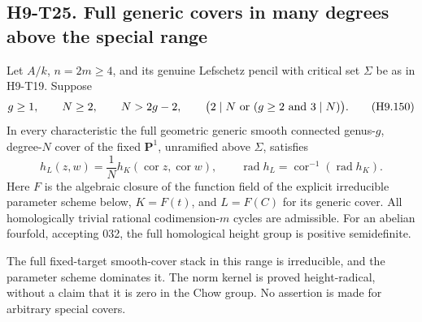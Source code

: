 
\subsection*{H9-T25. Full generic covers in many degrees above the special range}

\begin{theorem}[H9-T25]
Let $A/k$, $n=2m\ge4$, and its genuine Lefschetz pencil
with critical set $\Sigma$ be as in H9-T19. Suppose
\[
 g\ge1,\qquad N\ge2,\qquad N>2g-2,
 \qquad
 \bigl(2\mid N\ \hbox{or}\ (g\ge2\hbox{ and }3\mid N)\bigr).
                                                               \tag{H9.150}
\]
In every characteristic the full geometric generic
smooth connected genus-$g$, degree-$N$ cover of the
fixed $\mathbf P^1$, unramified above $\Sigma$, satisfies
\[
 h_L(z,w)=\frac1N h_K(\operatorname{cor}z,
                              \operatorname{cor}w),\qquad
 \operatorname{rad}h_L
       =\operatorname{cor}^{-1}(\operatorname{rad}h_K).
                                                               \tag{H9.151}
\]
Here $F$ is the algebraic closure of the function field
of the explicit irreducible parameter scheme below,
$K=F(t)$, and $L=F(C)$ for its generic cover. All
homologically trivial rational codimension-$m$ cycles
are admissible. For an abelian fourfold, accepting
032, the full homological height group is positive
semidefinite.

The full fixed-target smooth-cover stack in this
range is irreducible, and the parameter scheme
dominates it. The norm kernel is proved height-radical,
without a claim that it is zero in the Chow group.
No assertion is made for arbitrary special covers.
\end{theorem}

